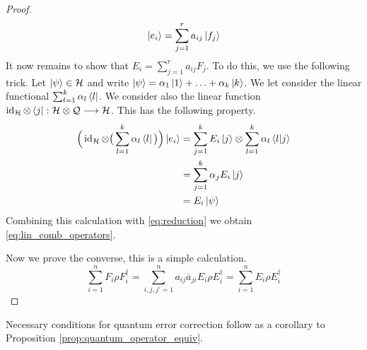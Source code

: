 \documentclass[12pt]{article}
\theoremstyle{plain}
\theoremstyle{definition}
\newcommand{\call}[1]{\mathcal{#1}}
\newcommand{\lto}{\longrightarrow}
\begin{document}
\begin{proof}
		\begin{equation}\label{eq:reduction}
			\ket{e_i} = \sum_{j = 1}^r a_{ij} \ket{f_j}
		\end{equation}
		It now remains to show that $E_i = \sum_{j = 1}^r a_{ij}F_j$. To do this, we use the following trick. Let $\ket{\psi} \in \call{H}$ and write $\ket{\psi} = \alpha_1 \ket{1} + \hdots + \alpha_k \ket{k}$. We let consider the linear functional $\sum_{l = 1}^k \alpha_l \bra{l}$. We consider also the linear function $\operatorname{id}_{\call{H}} \otimes \bra{j}: \call{H} \otimes \call{Q} \lto \call{H}$. This has the following property.
		\begin{align}
			\Big(\operatorname{id}_{\call{H}} \otimes \big(\sum_{l = 1}^k \alpha_l \bra{l}\big)\Big)\ket{e_i} &= \sum_{j = 1}^kE_i\ket{j} \otimes \sum_{l = 1}^k \alpha_l \bra{l}\ket{j}\\
			&= \sum_{j = 1}^k \alpha_j E_i\ket{j}\\
			&= E_i\ket{\psi}
		\end{align}
		Combining this calculation with \eqref{eq:reduction} we obtain \eqref{eq:lin_comb_operators}.
		
		Now we prove the converse, this is a simple calculation.
		\begin{equation}
			\sum_{i = 1}^n F_i \rho F_i^\dagger = \sum_{i, j, j' = 1}^n a_{ij}\overline{a}_{ji}E_i \rho E_i^\dagger = \sum_{i = 1}^n E_i \rho E_i^\dagger
		\end{equation}
	\end{proof}

Necessary conditions for quantum error correction follow as a corollary to Proposition \ref{prop:quantum_operator_equiv}.
\end{document}
